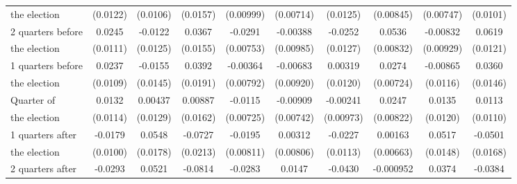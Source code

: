 \begin{table}[!ht]
\begin{tabular}{l*{9}{c}}
 the election                   &    (0.0122)         &    (0.0106)         &    (0.0157)         &   (0.00999)         &   (0.00714)         &    (0.0125)         &   (0.00845)         &   (0.00747)         &    (0.0101)         \\
[0.5em]
 2 quarters before&      0.0245\sym{*}  &     -0.0122         &      0.0367\sym{*}  &     -0.0291\sym{***}&    -0.00388         &     -0.0252\sym{*}  &      0.0536\sym{***}&    -0.00832         &      0.0619\sym{***}\\
  the election                   &    (0.0111)         &    (0.0125)         &    (0.0155)         &   (0.00753)         &   (0.00985)         &    (0.0127)         &   (0.00832)         &   (0.00929)         &    (0.0121)         \\
[0.5em]
 1 quarters before &      0.0237\sym{*}  &     -0.0155         &      0.0392\sym{*}  &    -0.00364         &    -0.00683         &     0.00319         &      0.0274\sym{***}&    -0.00865         &      0.0360\sym{*}  \\
 the election                   &    (0.0109)         &    (0.0145)         &    (0.0191)         &   (0.00792)         &   (0.00920)         &    (0.0120)         &   (0.00724)         &    (0.0116)         &    (0.0146)         \\
[0.5em]
Quarter of &      0.0132         &     0.00437         &     0.00887         &     -0.0115         &    -0.00909         &    -0.00241         &      0.0247\sym{**} &      0.0135         &      0.0113         \\
the election                    &    (0.0114)         &    (0.0129)         &    (0.0162)         &   (0.00725)         &   (0.00742)         &   (0.00973)         &   (0.00822)         &    (0.0120)         &    (0.0110)         \\
[0.5em]
 1 quarters after&     -0.0179         &      0.0548\sym{**} &     -0.0727\sym{***}&     -0.0195\sym{*}  &     0.00312         &     -0.0227\sym{*}  &     0.00163         &      0.0517\sym{***}&     -0.0501\sym{**} \\
   the election                  &    (0.0100)         &    (0.0178)         &    (0.0213)         &   (0.00811)         &   (0.00806)         &    (0.0113)         &   (0.00663)         &    (0.0148)         &    (0.0168)         \\
[0.5em]
 2 quarters after &     -0.0293\sym{**} &      0.0521\sym{**} &     -0.0814\sym{***}&     -0.0283\sym{***}&      0.0147\sym{*}  &     -0.0430\sym{***}&   -0.000952         &      0.0374\sym{*}  &     -0.0384\sym{*}  \\

\end{tabular}
\end{table}
